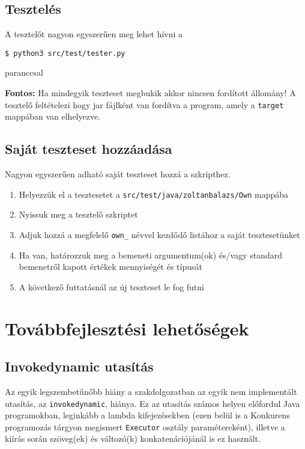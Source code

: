 \subsection{Tesztelés}

A tesztelőt nagyon egyszerűen meg lehet hívni a
\begin{verbatim}
$ python3 src/test/tester.py
\end{verbatim}
paranccsal

\textbf{Fontos:} Ha mindegyik teszteset megbukik akkor nincsen fordított állomány! A tesztelő feltételezi hogy jar fájlként van fordítva a program, amely a \lstinline{target} mappában van elhelyezve.

\subsection{Saját teszteset hozzáadása}

Nagyon egyszerűen adható saját teszteset hozzá a szkripthez.
\begin{enumerate}
	\item Helyezzük el a tesztesetet a \lstinline{src/test/java/zoltanbalazs/Own} mappába
	\item Nyissuk meg a tesztelő szkriptet
	\item Adjuk hozzá a megfelelő \lstinline{own_} névvel kezdődő listához a saját tesztesetünket
	\item Ha van, határozzuk meg a bemeneti argumentum(ok) és/vagy standard bemenetről kapott értékek mennyiségét és típusát
	\item A következő futtatásnál az új teszteset le fog futni
\end{enumerate}


\section{Továbbfejlesztési lehetőségek}

\subsection{Invokedynamic utasítás}

Az egyik legszembetűnőbb hiány a szakdolgozatban az egyik nem implementált utasítás, az \lstinline{invokedynamic}, hiánya.
Ez az utasítás számos helyen előfordul Java programokban, leginkább a lambda kifejezésekben (ezen belül is a Konkurens programozás tárgyon megismert \lstinline{Executor} osztály paramétereként), illetve a kiírás során szöveg(ek) és változó(k) konkatenációjánál is ez használt.

